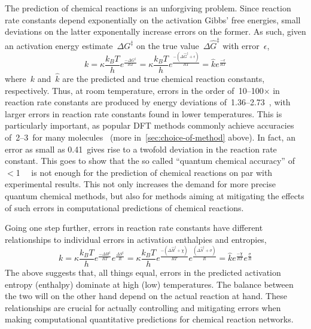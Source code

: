 The prediction of chemical reactions is an unforgiving problem.
Since reaction rate constants depend exponentially on the activation Gibbs' free energies,
small deviations on the latter exponentally increase errors on the former.
As such,
given an activation energy estimate~$\Delta G^\ddagger$ on the true value~$\Delta \widehat{G}^\ddagger$ with error~$\epsilon$,
%
\begin{equation}
	k = \kappa \frac{k_B T}{h} e^\frac{- \Delta G^\ddagger}{R T}
	= \kappa \frac{k_B T}{h} e^\frac{- \left(\Delta \widehat{G}^\ddagger + \epsilon\right)}{R T}
	= \widehat{k} e^\frac{- \epsilon}{R T}
\end{equation}
%
where~$k$ and~$\widehat{k}$ are the predicted and true chemical reaction constants,
respectively.
Thus,
at room temperature,
errors in the order of~10--100$\times$ in reaction rate constants are produced by energy deviations of~1.36--2.73~\kcalmol,
with larger errors in reaction rate constants found in lower temperatures.
This is particularly important,
as popular DFT methods commonly achieve accuracies of~2--3~\kcalmol for many molecules~\cite{Becke_2014,Bogojeski_2020} (more in~\cref{sec:choice-of-method} above).
In fact,
an error as small as 0.41~\kcalmol gives rise to a twofold deviation in the reaction rate constant.
This goes to show that the so called ``quantum chemical accuracy'' of $<$1~\kcalmol~\cite{Bogojeski_2020} is not enough for the prediction of chemical reactions on par with experimental results.
This not only increases the demand for more precise quantum chemical methods,
but also for methods aiming at mitigating the effects of such errors in computational predictions of chemical reactions.

Going one step further,
errors in reaction rate constants have different relationships to individual errors in activation enthalpies and entropies,
%
\begin{equation}
	k = \kappa \frac{k_B T}{h} e^\frac{- \Delta H^\ddagger}{R T}
	e^\frac{  \Delta S^\ddagger}{R}
	= \kappa \frac{k_B T}{h} e^\frac{- \left(\Delta \widehat{H}^\ddagger + \chi\right)}{R T}
	e^\frac{        \left(\Delta \widehat{S}^\ddagger + \sigma\right)}{R}
	= \widehat{k}
	e^\frac{- \chi}{R T}
	e^\frac{  \sigma}{R}
\end{equation}
%
The above suggests that,
all things equal,
errors in the predicted activation entropy (enthalpy) dominate at high (low) temperatures.
The balance between the two will on the other hand depend on the actual reaction at hand.
These relationships are crucial for actually controlling and mitigating errors when making computational quantitative predictions for chemical reaction networks.

